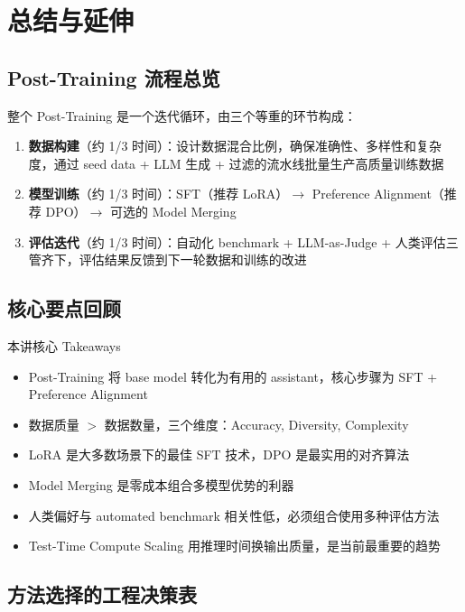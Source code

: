 \section{总结与延伸}

\subsection{Post-Training 流程总览}

整个 Post-Training 是一个迭代循环，由三个等重的环节构成：

\begin{enumerate}
    \item \textbf{数据构建}（约 1/3 时间）：设计数据混合比例，确保准确性、多样性和复杂度，通过 seed data + LLM 生成 + 过滤的流水线批量生产高质量训练数据
    \item \textbf{模型训练}（约 1/3 时间）：SFT（推荐 LoRA）$\rightarrow$ Preference Alignment（推荐 DPO）$\rightarrow$ 可选的 Model Merging
    \item \textbf{评估迭代}（约 1/3 时间）：自动化 benchmark + LLM-as-Judge + 人类评估三管齐下，评估结果反馈到下一轮数据和训练的改进
\end{enumerate}

\subsection{核心要点回顾}

\begin{importantbox}{本讲核心 Takeaways}
\begin{itemize}
    \item Post-Training 将 base model 转化为有用的 assistant，核心步骤为 SFT + Preference Alignment
    \item 数据质量 $>$ 数据数量，三个维度：Accuracy, Diversity, Complexity
    \item LoRA 是大多数场景下的最佳 SFT 技术，DPO 是最实用的对齐算法
    \item Model Merging 是零成本组合多模型优势的利器
    \item 人类偏好与 automated benchmark 相关性低，必须组合使用多种评估方法
    \item Test-Time Compute Scaling 用推理时间换输出质量，是当前最重要的趋势
\end{itemize}
\end{importantbox}

\subsection{方法选择的工程决策表}

